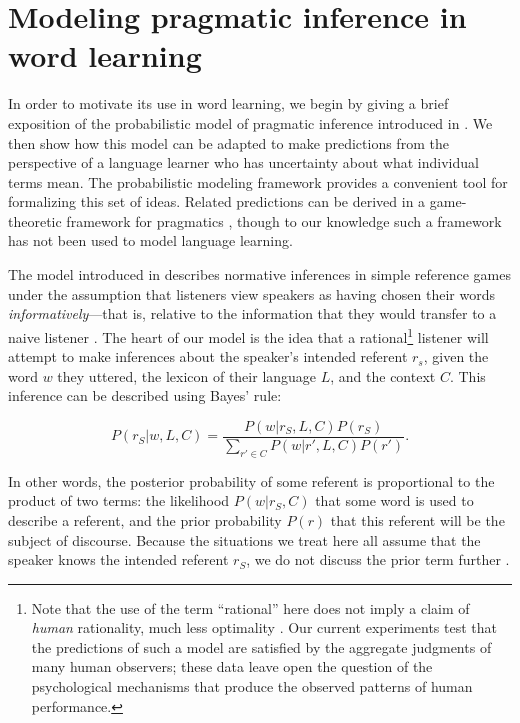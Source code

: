\documentclass[man,noapacite]{apa2}
\begin{document}
\section{Modeling pragmatic inference in word learning}


In order to motivate its use in word learning, we begin by giving a brief exposition of the probabilistic model of pragmatic inference introduced in . We then show how this model can be adapted to make predictions from the perspective of a language learner who has uncertainty about what individual terms mean. The probabilistic modeling framework provides a convenient tool for formalizing this set of ideas. Related predictions can be derived in a game-theoretic framework for pragmatics \cite{benz2005,franke2009,jager2010,franke2013}, though to our knowledge such a framework has not been used to model language learning. 

The model introduced in  describes normative inferences in simple reference games under the assumption that listeners view speakers as having chosen their words \emph{informatively}---that is, relative to the information that they would transfer to a naive listener \cite<see also>{goodman2013}. The heart of our model is the idea that a rational\footnote{Note that the use of the term ``rational'' here does not imply a claim of \emph{human} rationality, much less optimality \cite{frankinpressb}. Our current experiments test that the predictions of such a model are satisfied by the aggregate judgments of many human observers; these data leave open the question of the psychological mechanisms that produce the observed patterns of human performance.} listener will attempt to make inferences about the speaker's intended referent $r_s$, given the word $w$ they uttered, the lexicon of their language $L$, and the context $C$. This inference can be described using Bayes' rule:

\begin{equation}
\label{eq:listener}
P(r_S | w, L, C) = \frac{P(w | r_S, L, C) P(r_S)}{\displaystyle \sum_{r' \in C}{P(w | r', L, C) P(r')}}.
\end{equation}

\noindent In other words, the posterior probability of some referent is proportional to the product of two terms: the likelihood $P(w|r_S,C)$ that some word is used to describe a referent, and the prior probability $P(r)$ that this referent will be the subject of discourse. Because the situations we treat here all assume that the speaker knows the intended referent $r_S$, we do not discuss the prior term further \cite<for more details see>{frank2012}. 
\end{document}

